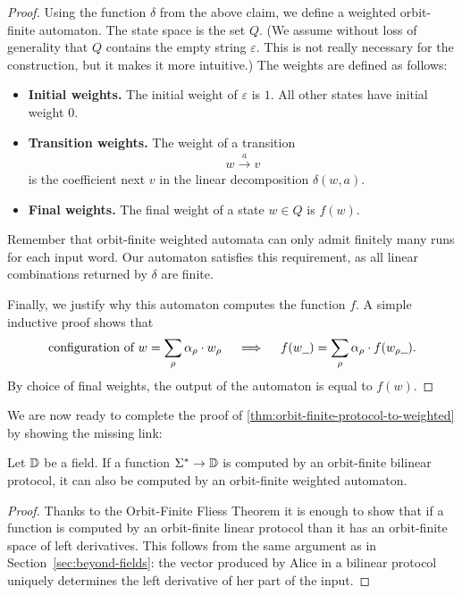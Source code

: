 \begin{proof}
    Using the function $\delta$ from the above claim, we define a weighted orbit-finite automaton. The state space is the set $Q$. (We assume without loss of generality that $Q$ contains the empty string $\varepsilon$. This is not really necessary for the construction, but it makes it more intuitive.) The weights are defined as follows: 
    \begin{itemize}
        \item \textbf{Initial weights.} The initial weight of   $\varepsilon$ is $1$. All other states have initial weight $0$.
        \item \textbf{Transition weights.} The weight of a transition 
        \begin{align*}
        w \xrightarrow{a} v
        \end{align*}
    is the coefficient next $v$ in the linear decomposition $\delta(w,a)$.
        \item \textbf{Final weights.} The final weight of a state $w \in Q$ is $f(w)$.
    \end{itemize}
    Remember that orbit-finite weighted automata can only admit finitely many runs for each input word.
    Our automaton satisfies this requirement, as all linear combinations returned by $\delta$ are finite. 

    Finally, we justify why this automaton computes the function $f$.   A simple inductive proof shows that  
    \begin{align*}
\text{configuration of $w$} = \sum_\rho \alpha_\rho \cdot w_\rho
\quad \implies \quad 
        f(w\underline{\hspace{2mm}}) = 
    \sum_\rho \alpha_\rho \cdot f(w_\rho\underline{\hspace{2mm}}).
    \end{align*}
    By choice of final weights,  the output of the automaton is equal to $f(w)$. 
\end{proof}

We are now ready to complete the proof of \cref{thm:orbit-finite-protocol-to-weighted} by showing the missing link:
\begin{claim}
\label{claim:bilinear-prot-to-of-automaton}
Let $\mathbb D$ be a field.
    If a function $\Sigma^* \to \mathbb D$ is computed by an orbit-finite bilinear protocol, it can also be computed by an 
    orbit-finite weighted automaton. 
\end{claim}
\begin{proof}
    Thanks to the Orbit-Finite Fliess Theorem it is enough to show that if a function is computed by an orbit-finite linear 
    protocol than it has an orbit-finite space of left derivatives. This follows from the same argument as in Section~\ref{sec:beyond-fields}:
    the vector produced by Alice in a bilinear protocol uniquely determines the left derivative of her part of the input. 
\end{proof}
